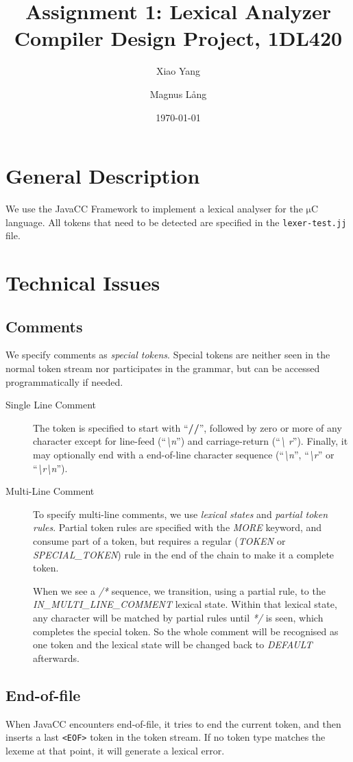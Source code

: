 \documentclass[a4paper,11pt]{article}
\title{Assignment 1: Lexical Analyzer \\
       Compiler Design Project, 1DL420}
\author{Xiao Yang \and Magnus L{\aa}ng} %
\date{\today}
\newcommand{\token}[1]{\texttt{<#1>}}
\newcommand{\uC}{{$\mathrm{\mu}$}C }
\begin{document}
\maketitle
\section{General Description}
We use the JavaCC Framework to implement a lexical analyser for the \uC
language. All tokens that need to be detected are specified in the
\texttt{lexer-test.jj} file.

\section{Technical Issues}
\subsection{Comments}
We specify comments as \emph{special tokens}. Special tokens are neither seen in
the normal token stream nor participates in the grammar, but can be accessed
programmatically if needed.
\begin{description}
\item[Single Line Comment] The token is specified to start with ``\textbf{//}'',
  followed by zero or more of any character except for line-feed
  (``\textit{\textbackslash n}'') and carriage-return (``\textit{\textbackslash
    r}''). Finally, it may optionally end with a end-of-line character sequence
  (``\textit{\textbackslash n}'', ``\textit{\textbackslash r}'' or
  ``\textit{\textbackslash r\textbackslash n}'').
\item[Multi-Line Comment] To specify multi-line comments, we use \emph{lexical
    states} and \emph{partial token rules}. Partial token rules are specified
  with the \emph{MORE} keyword, and consume part of a token, but requires a
  regular (\emph{TOKEN} or \emph{SPECIAL\_TOKEN}) rule in the end of the chain
  to make it a complete token.

  When we see a \textit{/*} sequence, we transition, using a partial rule, to
  the \emph{IN\_MULTI\_LINE\_COMMENT} lexical state. Within that lexical state,
  any character will be matched by partial rules until \textit{*/} is seen,
  which completes the special token. So the whole comment will be recognised as
  one token and the lexical state will be changed back to \emph{DEFAULT}
  afterwards.

\end{description}
\subsection{End-of-file}
When JavaCC encounters end-of-file, it tries to end the current token, and then
inserts a last \token{EOF} token in the token stream. If no token type matches
the lexeme at that point, it will generate a lexical error.
\end{document}
